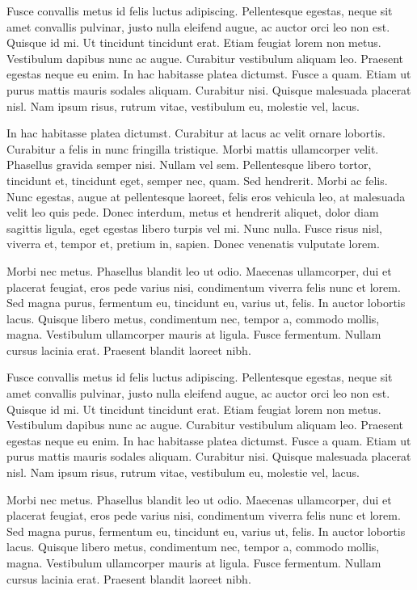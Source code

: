 \begin{multicols}{2}
Fusce convallis metus id felis luctus adipiscing. Pellentesque
egestas, neque sit amet convallis pulvinar, justo nulla eleifend
augue, ac auctor orci leo non est. Quisque id mi. Ut tincidunt
tincidunt erat. Etiam feugiat lorem non metus. Vestibulum dapibus nunc
ac augue. Curabitur vestibulum aliquam leo. Praesent egestas neque eu
enim. In hac habitasse platea dictumst. Fusce a quam. Etiam ut purus
mattis mauris sodales aliquam. Curabitur nisi. Quisque malesuada
placerat nisl. Nam ipsum risus, rutrum vitae, vestibulum eu, molestie
vel, lacus.

In hac habitasse platea dictumst. Curabitur at lacus ac velit ornare
lobortis. Curabitur a felis in nunc fringilla tristique. Morbi mattis
ullamcorper velit. Phasellus gravida semper nisi. Nullam vel sem.
Pellentesque libero tortor, tincidunt et, tincidunt eget, semper nec,
quam. Sed hendrerit. Morbi ac felis. Nunc egestas, augue at
pellentesque laoreet, felis eros vehicula leo, at malesuada velit leo
quis pede. Donec interdum, metus et hendrerit aliquet, dolor diam
sagittis ligula, eget egestas libero turpis vel mi. Nunc nulla. Fusce
risus nisl, viverra et, tempor et, pretium in, sapien. Donec venenatis
vulputate lorem.

Morbi nec metus. Phasellus blandit leo ut odio. Maecenas ullamcorper,
dui et placerat feugiat, eros pede varius nisi, condimentum viverra
felis nunc et lorem. Sed magna purus, fermentum eu, tincidunt eu,
varius ut, felis. In auctor lobortis lacus. Quisque libero metus,
condimentum nec, tempor a, commodo mollis, magna. Vestibulum
ullamcorper mauris at ligula. Fusce fermentum. Nullam cursus lacinia
erat. Praesent blandit laoreet nibh.

Fusce convallis metus id felis luctus adipiscing. Pellentesque
egestas, neque sit amet convallis pulvinar, justo nulla eleifend
augue, ac auctor orci leo non est. Quisque id mi. Ut tincidunt
tincidunt erat. Etiam feugiat lorem non metus. Vestibulum dapibus nunc
ac augue. Curabitur vestibulum aliquam leo. Praesent egestas neque eu
enim. In hac habitasse platea dictumst. Fusce a quam. Etiam ut purus
mattis mauris sodales aliquam. Curabitur nisi. Quisque malesuada
placerat nisl. Nam ipsum risus, rutrum vitae, vestibulum eu, molestie
vel, lacus.

Morbi nec metus. Phasellus blandit leo ut odio. Maecenas ullamcorper,
dui et placerat feugiat, eros pede varius nisi, condimentum viverra
felis nunc et lorem. Sed magna purus, fermentum eu, tincidunt eu,
varius ut, felis. In auctor lobortis lacus. Quisque libero metus,
condimentum nec, tempor a, commodo mollis, magna. Vestibulum
ullamcorper mauris at ligula. Fusce fermentum. Nullam cursus lacinia
erat. Praesent blandit laoreet nibh.


\end{multicols}
